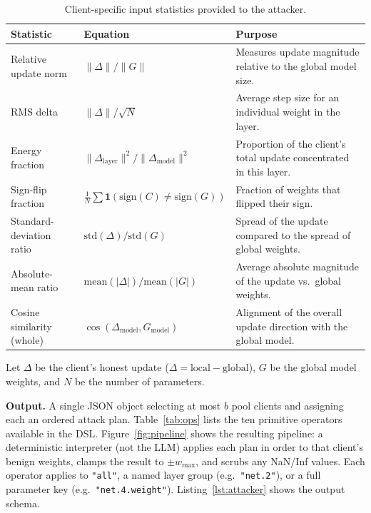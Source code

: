 \documentclass[conference,9pt]{IEEEtran}
\begin{document}
\begin{table}[!ht]
\caption{Client-specific input statistics provided to the attacker.}
\label{tab:input_stats}
\centering
\small
\begin{tabular}{@{}p{1.8cm}p{3.0cm}p{3.2cm}@{}}
\toprule
\textbf{Statistic} & \textbf{Equation} & \textbf{Purpose} \\
\midrule
Relative update norm & $\|\Delta\| / \|G\|$ & Measures update magnitude relative to the global model size. \\
RMS delta & $\|\Delta\| / \sqrt{N}$ & Average step size for an individual weight in the layer. \\
Energy fraction & $\|\Delta_{\mathrm{layer}}\|^2 / \|\Delta_{\mathrm{model}}\|^2$ & Proportion of the client's total update concentrated in this layer. \\
Sign-flip fraction & $\frac{1}{N} \sum \mathbf{1}(\mathrm{sign}(C) \neq \mathrm{sign}(G))$ & Fraction of weights that flipped their sign. \\
Standard-deviation ratio & $\mathrm{std}(\Delta) / \mathrm{std}(G)$ & Spread of the update compared to the spread of global weights. \\
Absolute-mean ratio & $\mathrm{mean}(|\Delta|) / \mathrm{mean}(|G|)$ & Average absolute magnitude of the update vs.\ global weights. \\
Cosine similarity (whole) & $\cos(\Delta_{\mathrm{model}}, G_{\mathrm{model}})$ & Alignment of the overall update direction with the global model. \\
\bottomrule
\end{tabular}
\vspace{1mm}

\small Let $\Delta$ be the client's honest update ($\Delta = \mathrm{local} - \mathrm{global}$), $G$ be the global model weights, and $N$ be the number of parameters.
\end{table}


\textbf{Output.} A single JSON object selecting at most $b$ pool clients and assigning each an ordered attack plan. Table~\ref{tab:ops} lists the ten primitive operators available in the DSL. Figure~\ref{fig:pipeline} shows the resulting pipeline: a deterministic interpreter (not the LLM) applies each plan in order to that client's benign weights, clamps the result to $\pm w_{\max}$, and scrubs any NaN/Inf values. Each operator applies to \texttt{"all"}, a named layer group (e.g.\ \texttt{"net.2"}), or a full parameter key (e.g.\ \texttt{"net.4.weight"}). Listing~\ref{lst:attacker} shows the output schema.
\end{document}
